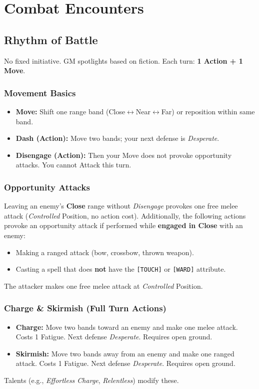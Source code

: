 \section{Combat Encounters}

\subsection{Rhythm of Battle}
No fixed initiative. GM spotlights based on fiction. Each turn: \textbf{1 Action + 1 Move}.

\subsubsection*{Movement Basics}
\begin{itemize}[leftmargin=*]
  \item \textbf{Move:} Shift one range band (Close$\leftrightarrow$Near$\leftrightarrow$Far) or reposition within same band.
  \item \textbf{Dash (Action):} Move two bands; your next defense is \textit{Desperate}.
  \item \textbf{Disengage (Action):} Then your Move does not provoke opportunity attacks. You cannot Attack this turn.
\end{itemize}

\subsubsection*{Opportunity Attacks}
Leaving an enemy's \textbf{Close} range without \textit{Disengage} provokes one free melee attack (\textit{Controlled} Position, no action cost). Additionally, the following actions provoke an opportunity attack if performed while \textbf{engaged in Close} with an enemy:
\begin{itemize}[leftmargin=*]
  \item Making a ranged attack (bow, crossbow, thrown weapon).
  \item Casting a spell that does \textbf{not} have the \texttt{[TOUCH]} or \texttt{[WARD]} attribute.
\end{itemize}
The attacker makes one free melee attack at \textit{Controlled} Position.

\subsubsection*{Charge \& Skirmish (Full Turn Actions)}
\begin{itemize}[leftmargin=*]
  \item \textbf{Charge:} Move two bands toward an enemy and make one melee attack. Costs 1 Fatigue. Next defense \textit{Desperate}. Requires open ground.
  \item \textbf{Skirmish:} Move two bands away from an enemy and make one ranged attack. Costs 1 Fatigue. Next defense \textit{Desperate}. Requires open ground.
\end{itemize}
Talents (e.g., \textit{Effortless Charge}, \textit{Relentless}) modify these.

